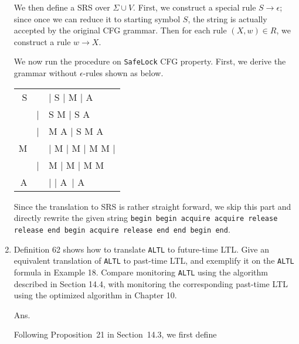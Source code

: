 \documentclass{article}
\begin{document}
\begin{enumerate}
We then define a SRS over $\Sigma \cup V$.
First, we construct a special rule $S \to \epsilon$;
since once we can reduce it to starting symbol $S$,
the string is actually accepted by the original CFG grammar.
Then for each rule $(X, w) \in R$, we construct a rule $w \to X$.

We now run the procedure on \texttt{SafeLock} CFG property.
First, we derive the grammar without $\epsilon$-rules shown as below.

\begin{tabular}{rcl}
	S & \to & \ACQ \REL | S \ACQ \REL | \ACQ M \REL | \ACQ \REL A                       \\
	  &  |  & S \ACQ M \REL | S \ACQ \REL A                                             \\
	  &  |  & \ACQ M \REL A | S \ACQ M \REL A                                           \\
	M & \to & \BEGIN \END | M \BEGIN \END | \BEGIN M \END | M \BEGIN M \END | \ACQ \REL \\
	  &  |  & M \ACQ \REL | \ACQ M \REL | M \ACQ M \REL                                 \\
	A & \to & \BEGIN | \END | A\ \BEGIN | A\ \END
\end{tabular}

Since the translation to SRS is rather straight forward, we skip this part and directly
rewrite the given string
\texttt{begin begin acquire acquire release release
end begin acquire release end end begin end}.


\newcommand{\ALTL}{\texttt{ALTL}\xspace}
\item Definition 62 shows how to translate \ALTL to future-time LTL.
Give an equivalent translation of \ALTL to past-time LTL,
and exemplify it on the \ALTL formula in Example 18.
Compare monitoring \ALTL using the algorithm described in Section 14.4,
with monitoring the corresponding past-time LTL using the optimized
algorithm in Chapter 10.

Ans.

Following Proposition~21 in Section~14.3,
we first define 

\end{enumerate}
\end{document}
